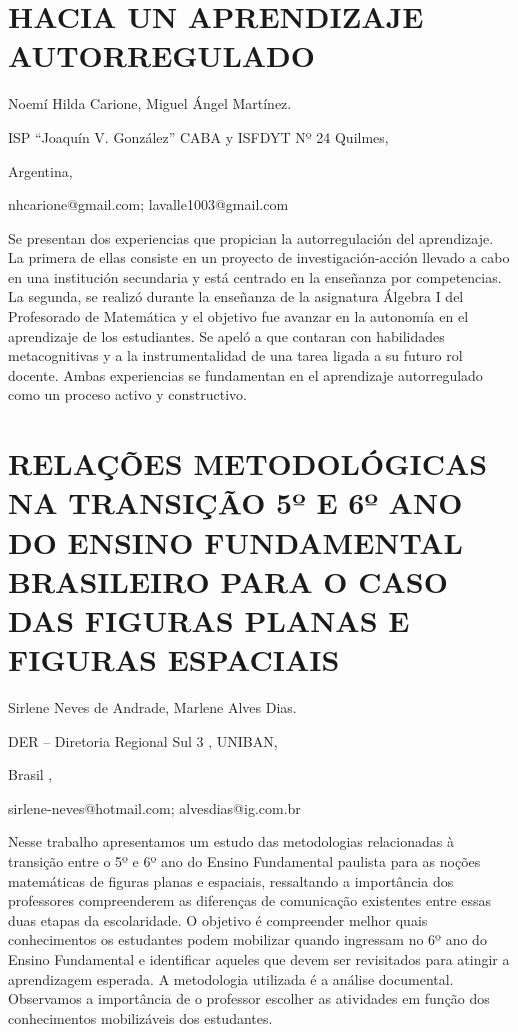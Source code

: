 \section{HACIA UN APRENDIZAJE AUTORREGULADO}

\begin{datos}

Noemí Hilda Carione, Miguel Ángel Martínez.

ISP “Joaquín V. González” CABA y ISFDYT Nº 24 Quilmes,

Argentina,

nhcarione@gmail.com; lavalle1003@gmail.com

\end{datos}

Se presentan dos experiencias que propician la autorregulación del
aprendizaje. La primera de ellas consiste en un proyecto de investigación-acción
llevado a cabo en una institución secundaria y está centrado en la
enseñanza por competencias. La segunda, se realizó durante la enseñanza
de la asignatura Álgebra I del Profesorado de Matemática y el objetivo
fue avanzar en la autonomía en el aprendizaje de los estudiantes.
Se apeló a que contaran con habilidades metacognitivas y a la instrumentalidad
de una tarea ligada a su futuro rol docente. Ambas experiencias se
fundamentan en el aprendizaje autorregulado como un proceso activo
y constructivo.


\section{RELAÇÕES METODOLÓGICAS NA TRANSIÇÃO 5º E 6º ANO DO ENSINO FUNDAMENTAL
BRASILEIRO PARA O CASO DAS FIGURAS PLANAS E FIGURAS ESPACIAIS}

\begin{datos}

Sirlene Neves de Andrade, Marlene Alves Dias.

DER – Diretoria Regional Sul 3 , UNIBAN,

Brasil ,

sirlene-neves@hotmail.com; alvesdias@ig.com.br

\end{datos}

Nesse trabalho apresentamos um estudo das metodologias relacionadas
à transição entre o 5º e 6º ano do Ensino Fundamental paulista para
as noções matemáticas de figuras planas e espaciais, ressaltando a
importância dos professores compreenderem as diferenças de comunicação
existentes entre essas duas etapas da escolaridade. O objetivo é compreender
melhor quais conhecimentos os estudantes podem mobilizar quando ingressam
no 6º ano do Ensino Fundamental e identificar aqueles que devem ser
revisitados para atingir a aprendizagem esperada. A metodologia utilizada
é a análise documental. Observamos a importância de o professor escolher
as atividades em função dos conhecimentos mobilizáveis dos estudantes. 


